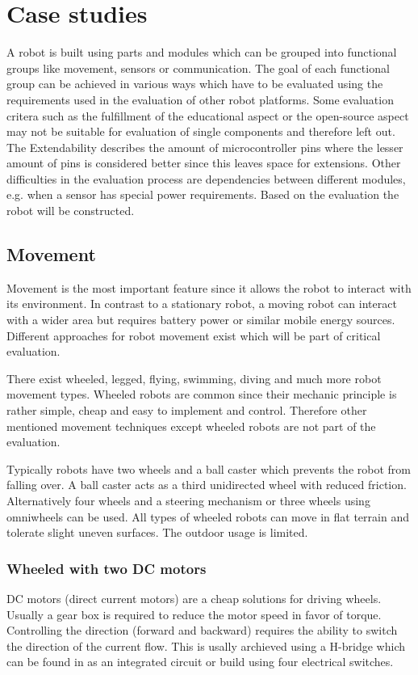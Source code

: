 \documentclass[11pt,a4paper]{article}
\begin{document}
\section{Case studies}
A robot is built using parts and modules which can be grouped into functional groups like movement, sensors or communication. The goal of each functional group can be achieved in various ways which have to be evaluated using the requirements used in the evaluation of other robot platforms. Some evaluation critera such as the fulfillment of the educational aspect or the open-source aspect may not be suitable for evaluation of single components and therefore left out. The Extendability describes the amount of microcontroller pins where the lesser amount of pins is considered better since this leaves space for extensions. Other difficulties in the evaluation process are dependencies between different modules, e.g. when a sensor has special power requirements. Based on the evaluation the robot will be constructed.
\subsection{Movement}
Movement is the most important feature since it allows the robot to interact with its environment. In contrast to a stationary robot, a moving robot can interact with a wider area but requires battery power or similar mobile energy sources. Different approaches for robot movement exist which will be part of critical evaluation.

There exist wheeled, legged, flying, swimming, diving and much more robot movement types. Wheeled robots are common since their mechanic principle is rather simple, cheap and easy to implement and control. Therefore other mentioned movement techniques except wheeled robots are not part of the evaluation.

Typically robots have two wheels and a ball caster which prevents the robot from falling over. A ball caster acts as a third unidirected wheel with reduced friction. Alternatively four wheels and a steering mechanism or three wheels using omniwheels can be used. All types of wheeled robots can move in flat terrain and tolerate slight uneven surfaces. The outdoor usage is limited.
\subsubsection{Wheeled with two DC motors}
DC motors (direct current motors) are a cheap solutions for driving wheels. Usually a gear box is required to reduce the motor speed in favor of torque. Controlling the direction (forward and backward) requires the ability to switch the direction of the current flow. This is usally archieved using a H-bridge which can be found in as an integrated circuit or build using four electrical switches. 
\end{document}
